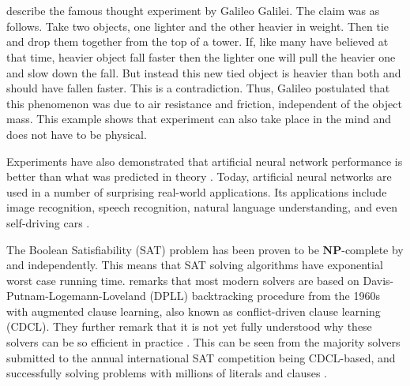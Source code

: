 \fancyhead[LE,RO]{\thepage}

\chapter{\chIntroduction}
\label{ch:introduction}




\citet{gowerScientificMethodHistorical2012} describe the famous thought experiment by Galileo Galilei.
The claim was as follows.
Take two objects, one lighter and the other heavier in weight.
Then tie and drop them together from the top of a tower.
If, like many have believed at that time, heavier object fall faster then the lighter one will pull the heavier one and slow down the fall.
But instead this new tied object is heavier than both and should have fallen faster.
This is a contradiction.
Thus, Galileo postulated that this phenomenon was due to air resistance and friction, independent of the object mass.
This example shows that experiment can also take place in the mind and does not have to be physical.

Experiments have also demonstrated that artificial neural network performance is better than what was predicted in theory \citep{tichyShouldComputerScientists1998}.
Today, artificial neural networks are used in a number of surprising real-world applications.
Its applications include image recognition, speech recognition, natural language understanding, and even self-driving cars \citep{lecunDeepLearning2015}.

The Boolean Satisfiability (SAT) problem has been proven to be $\textbf{NP}$-complete by \citet{cook1971complexity} and \citet{levin1973universal} independently.
This means that SAT solving algorithms have exponential worst case running time.
\citet{nordstromPebbleGamesProof2013} remarks that most modern solvers are based on Davis-Putnam-Logemann-Loveland (DPLL) backtracking procedure from the 1960s with augmented clause learning, also known as conflict-driven clause learning (CDCL).
They further remark that it is not yet fully understood why these solvers can be so efficient in practice \citep{elffersTradeoffsTimeMemory2016}.
This can be seen from the majority solvers submitted to the annual international SAT competition being CDCL-based, and successfully solving problems with millions of literals and clauses \citep{heule2018proceedings}.


